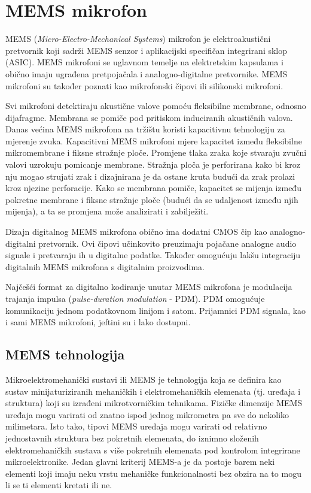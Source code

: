 \section{MEMS mikrofon}

MEMS (\textit{Micro-Electro-Mechanical Systems}) mikrofon je elektroakustični pretvornik koji sadrži MEMS senzor i aplikacijski specifičan integrirani sklop (ASIC). MEMS mikrofoni se uglavnom temelje na elektretskim kapsulama i obično imaju ugrađena pretpojačala i analogno-digitalne pretvornike. MEMS mikrofoni su također poznati kao mikrofonski čipovi ili silikonski mikrofoni.

Svi mikrofoni detektiraju akustične valove pomoću fleksibilne membrane, odnosno dijafragme. Membrana se pomiče pod pritiskom induciranih akustičnih valova. Danas većina MEMS mikrofona na tržištu koristi kapacitivnu tehnologiju za mjerenje zvuka. Kapacitivni MEMS mikrofoni mjere kapacitet između fleksibilne mikromembrane i fiksne stražnje ploče. Promjene tlaka zraka koje stvaraju zvučni valovi uzrokuju pomicanje membrane. Stražnja ploča je perforirana kako bi kroz nju mogao strujati zrak i dizajnirana je da ostane kruta budući da zrak prolazi kroz njezine perforacije. Kako se membrana pomiče, kapacitet se mijenja između pokretne membrane i fiksne stražnje ploče (budući da se udaljenost između njih mijenja), a ta se promjena može analizirati i zabilježiti.

Dizajn digitalnog MEMS mikrofona obično ima dodatni CMOS čip kao analogno-digitalni pretvornik. Ovi čipovi učinkovito preuzimaju pojačane analogne audio signale i pretvaraju ih u digitalne podatke. Također omogućuju lakšu integraciju digitalnih MEMS mikrofona s digitalnim proizvodima.

Najčešći format za digitalno kodiranje unutar MEMS mikrofona je modulacija trajanja impulsa (\textit{pulse-duration modulation} - PDM). PDM omogućuje komunikaciju jednom podatkovnom linijom i satom. Prijamnici PDM signala, kao i sami MEMS mikrofoni, jeftini su i lako dostupni.

\subsection{MEMS tehnologija}
Mikroelektromehanički sustavi ili MEMS je tehnologija koja se definira kao sustav minijaturiziranih mehaničkih i elektromehaničkih elemenata (tj. uređaja i struktura) koji su izrađeni mikrotvorničkim tehnikama. Fizičke dimenzije MEMS uređaja mogu varirati od znatno ispod jednog mikrometra pa sve do nekoliko milimetara. Isto tako, tipovi MEMS uređaja mogu varirati od relativno jednostavnih struktura bez pokretnih elemenata, do iznimno složenih elektromehaničkih sustava s više pokretnih elemenata pod kontrolom integrirane mikroelektronike. Jedan glavni kriterij MEMS-a je da postoje barem neki elementi koji imaju neku vrstu mehaničke funkcionalnosti bez obzira na to mogu li se ti elementi kretati ili ne.

